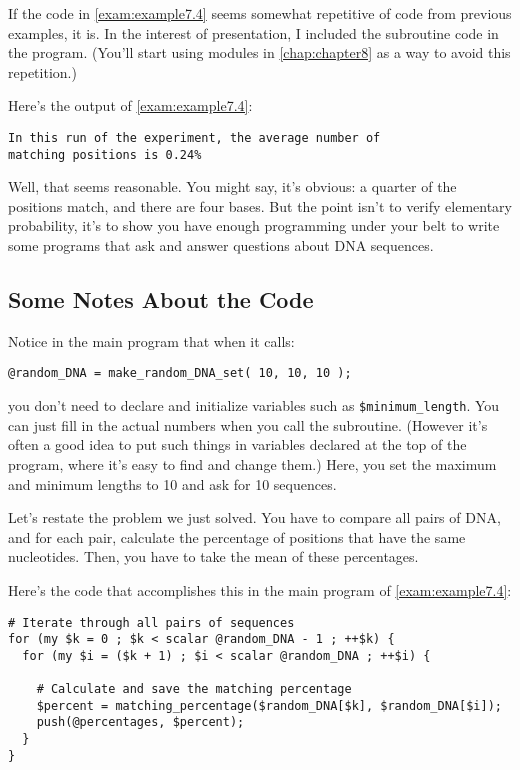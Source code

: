 If the code in \autoref{exam:example7.4} seems somewhat repetitive of code from previous examples, it is. In the interest of presentation, I included the subroutine code in the program. (You'll start using modules in \autoref{chap:chapter8} as a way to avoid this repetition.) 

Here's the output of \autoref{exam:example7.4}:

\begin{lstlisting}
In this run of the experiment, the average number of 
matching positions is 0.24%
\end{lstlisting}

Well, that seems reasonable. You might say, it's obvious: a quarter of the positions match, and there are four bases. But the point isn't to verify elementary probability, it's to show you have enough programming under your belt to write some programs that ask and answer questions about DNA sequences. 

\subsection{Some Notes About the Code}
Notice in the main program that when it calls:

\begin{lstlisting}
@random_DNA = make_random_DNA_set( 10, 10, 10 );
\end{lstlisting}

you don't need to declare and initialize variables such as \verb|$minimum_length|. You can just fill in the actual numbers when you call the subroutine. (However it's often a good idea to put such things in variables declared at the top of the program, where it's easy to find and change them.) Here, you set the maximum and minimum lengths to 10 and ask for 10 sequences.

Let's restate the problem we just solved. You have to compare all pairs of DNA, and for each pair, calculate the percentage of positions that have the same nucleotides. Then, you have to take the mean of these percentages.

Here's the code that accomplishes this in the main program of \autoref{exam:example7.4}:

\begin{lstlisting}
# Iterate through all pairs of sequences
for (my $k = 0 ; $k < scalar @random_DNA - 1 ; ++$k) {
  for (my $i = ($k + 1) ; $i < scalar @random_DNA ; ++$i) {

    # Calculate and save the matching percentage
    $percent = matching_percentage($random_DNA[$k], $random_DNA[$i]);
    push(@percentages, $percent);
  }
}
\end{lstlisting}

